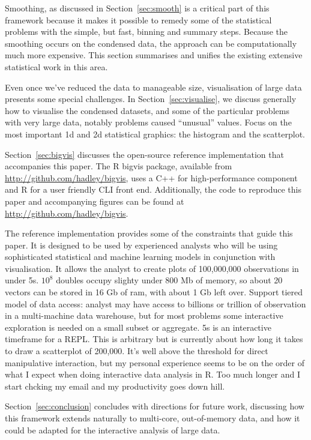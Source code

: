 \documentclass[journal]{vgtc}                %
\begin{document}
Smoothing, as discussed in Section~\ref{sec:smooth} is a critical part of this framework because it makes it possible to remedy some of the statistical problems with the simple, but fast, binning and summary steps. Because the smoothing occurs on the condensed data, the approach can be computationally much more expensive. This section summarises and unifies the existing extensive statistical work in this area.

Even once we've reduced the data to manageable size, visualisation of large data presents some special challenges. In Section~\ref{sec:visualise}, we discuss generally how to visualise the condensed datasets, and some of the particular problems with very large data, notably problems caused ``unusual'' values.  Focus on the most important 1d and 2d statistical graphics: the histogram and the scatterplot.

Section~\ref{sec:bigvis} discusses the open-source reference implementation that accompanies this paper. The R \citep{R} bigvis package, available from \url{http://github.com/hadley/bigvis}, uses a C++ for high-performance component and R for a user friendly CLI front end.  Additionally, the code to reproduce this paper and accompanying figures can be found at \url{http://github.com/hadley/bigvis}.

The reference implementation provides some of the constraints that guide this paper. It is designed to be used by experienced analysts who will be using  sophisticated statistical and machine learning models in conjunction with visualisation.  It allows the analyst to create plots of 100,000,000 observations in under 5s. $10^8$ doubles occupy slighty under 800 Mb of memory, so about 20 vectors can be stored in 16 Gb of ram, with about 1 Gb left over. Support tiered model of data access: analyst may have access to billions or trillion of observation in a multi-machine data warehouse, but for most problems some interactive exploration is needed on a small subset or aggregate. 5s is an interactive timeframe for a REPL.  This is arbitrary but is currently about how long it takes to draw a scatterplot of 200,000. It's well above the threshold for direct manipulative interaction, but my personal experience seems to be on the order of what I expect when doing interactive data analysis in R.  Too much longer and I start chcking my email and my productivity goes down hill.

Section~\ref{sec:conclusion} concludes with directions for future work, discussing how this framework extends naturally to multi-core, out-of-memory data, and how it could be adapted for the interactive analysis of large data.
\end{document}
